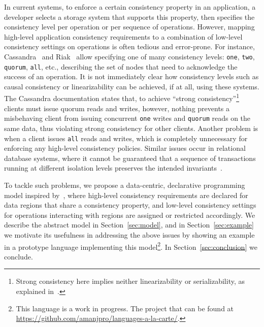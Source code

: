 \documentclass[preprint,numbers]{sigplanconf}
\begin{document}
In current systems, to enforce a certain consistency
property in an application, a developer selects a storage system that
supports this property, then specifies the consistency level per
operation or per
sequence of operations. However, mapping high-level application consistency requirements to a combination of
low-level consistency settings on operations is often tedious and error-prone.
For instance,
Cassandra~\cite{lakshman2010cassandra} and Riak~\cite{riak} allow specifying one of many
consistency levels:
\texttt{one}, \texttt{two}, \texttt{quorum}, \texttt{all}, etc., describing
the set of nodes that need to
acknowledge the success of an operation. It
is not immediately clear how consistency levels such as causal consistency or
linearizability can be achieved, if at all, using these systems. The Cassandra documentation
states that,
to achieve ``strong consistency''\footnote{Strong consistency here implies
neither linearizability or serializability, as explained in~\cite{sivaramakrishnan2016representation}.} clients must issue quorum reads and writes,
however, nothing prevents a misbehaving client from issuing concurrent \texttt{one} writes and
\texttt{quorum} reads on the same data, thus violating strong consistency for other clients. Another
problem is when a client issues \texttt{all} reads and writes, which is completely
unnecessary for enforcing any high-level consistency policies. Similar issues
occur in relational database systems, where it cannot be guaranteed that a
sequence of transactions running at different isolation levels preserves the intended
invariants~\cite{gray1992transaction}. 


To tackle such problems, we propose a data-centric, declarative programming
model inspired by~\cite{dolby2012data}, where
high-level consistency requirements are declared for data regions that share a
consistency property, and low-level consistency settings for operations interacting with
regions are assigned or restricted accordingly. We
describe the abstract model in Section~\ref{sec:model}, and in
Section~\ref{sec:example} we motivate its usefulness in addressing the above issues by showing
an example in a prototype language implementing this model\footnote{This
  language is a work in progress. The project that can be found at
  \url{https://github.com/amanjpro/languages-a-la-carte/}.}.
In Section~\ref{sec:conclusion} we conclude.
\end{document}
